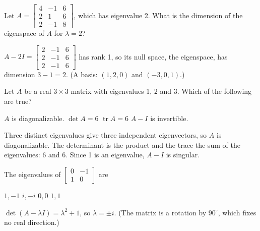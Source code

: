 \begin{question}[id=eig-4, marks=2]
Let $A = \begin{bmatrix} 4 & -1 & 6 \\ 2 & 1 & 6 \\ 2 & -1 & 8 \end{bmatrix}$, which has eigenvalue 2. What is the dimension of the eigenspace of $A$ for $\lambda = 2$?
\begin{solution}
$A - 2I = \begin{bmatrix} 2 & -1 & 6 \\ 2 & -1 & 6 \\ 2 & -1 & 6 \end{bmatrix}$ has rank 1, so its null space, the eigenspace, has dimension $3 - 1 = 2$. (A basis: $(1, 2, 0)$ and $(-3, 0, 1)$.)
\end{solution}
\end{question}

\begin{question}[id=eig-5, type=msq, marks=2]
Let $A$ be a real $3 \times 3$ matrix with eigenvalues 1, 2 and 3. Which of the following are true?
\begin{options}
  \correct $A$ is diagonalizable.
  \correct $\det A = 6$
  \correct $\operatorname{tr} A = 6$
  \option $A - I$ is invertible.
\end{options}
\begin{solution}
Three distinct eigenvalues give three independent eigenvectors, so $A$ is diagonalizable. The determinant is the product and the trace the sum of the eigenvalues: $6$ and $6$. Since 1 is an eigenvalue, $A - I$ is singular.
\end{solution}
\end{question}

\begin{question}[id=eig-6]
The eigenvalues of $\begin{bmatrix} 0 & -1 \\ 1 & 0 \end{bmatrix}$ are
\begin{options}
  \option $1, -1$
  \correct $i, -i$
  \option $0, 0$
  \option $1, 1$
\end{options}
\begin{solution}
$\det(A - \lambda I) = \lambda^2 + 1$, so $\lambda = \pm i$. (The matrix is a rotation by $90^\circ$, which fixes no real direction.)
\end{solution}
\end{question}

